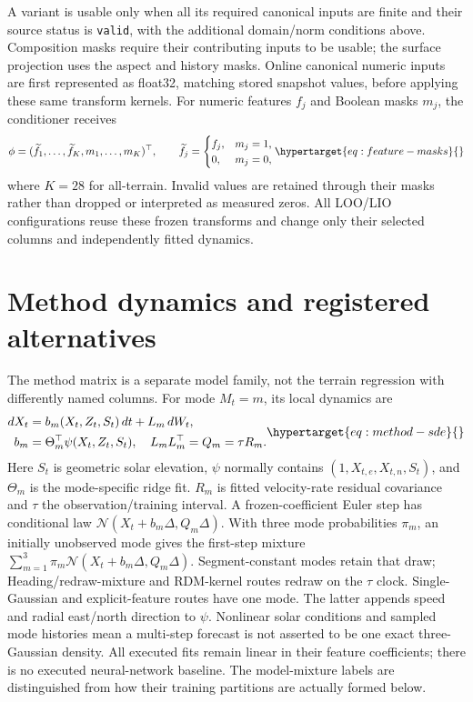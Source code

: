 A variant is usable only when all its required canonical inputs are finite
and their source status is \texttt{valid}, with the additional domain/norm
conditions above. Composition masks require their contributing inputs to be
usable; the surface projection uses the aspect and history masks. Online
canonical numeric inputs are first represented as float32, matching stored
snapshot values, before applying these same transform kernels. For numeric
features \(f_j\) and Boolean masks \(m_j\), the conditioner receives
\begin{equation}
 \phi=(\widetilde f_1,\ldots,\widetilde f_K,m_1,\ldots,m_K)^\top,
 \qquad \widetilde f_j=
 \begin{cases}f_j,&m_j=1,\\0,&m_j=0,\end{cases}
 \label{eq:feature-masks}\hypertarget{eq:feature-masks}{}
\end{equation}
where \(K=28\) for all-terrain. Invalid values are retained through their
masks rather than dropped or interpreted as measured zeros. All LOO/LIO
configurations reuse these frozen transforms and change only their selected
columns and independently fitted dynamics.


\section{Method dynamics and registered alternatives}
\label{sec:method-model}\hypertarget{sec:method-model}{}
The method matrix is a separate model family, not the terrain regression
with differently named columns. For mode \(M_t=m\), its local dynamics are
\begin{equation}
 \begin{aligned}
 dX_t&=b_m(X_t,Z_t,S_t)\,dt+L_m\,dW_t,\\
 b_m&=\Theta_m^\top\psi(X_t,Z_t,S_t),\quad L_mL_m^\top=Q_m=\tau R_m.
 \end{aligned}
 \label{eq:method-sde}\hypertarget{eq:method-sde}{}
\end{equation}
Here \(S_t\) is geometric solar elevation, \(\psi\) normally contains
\((1,X_{t,e},X_{t,n},S_t)\), and \(\Theta_m\) is the mode-specific ridge fit.
\(R_m\) is fitted velocity-rate residual covariance and \(\tau\) the
observation/training interval. A frozen-coefficient Euler step has conditional
law \(\mathcal N(X_t+b_m\Delta,Q_m\Delta)\).
With three mode probabilities \(\pi_m\), an initially unobserved mode gives
the first-step mixture \(\sum_{m=1}^3\pi_m\mathcal N(X_t+b_m\Delta,Q_m\Delta)\).
Segment-constant modes retain that draw; Heading/redraw-mixture and RDM-kernel
routes redraw on the \(\tau\) clock. Single-Gaussian and explicit-feature
routes have one mode. The latter appends speed and radial east/north direction
to \(\psi\). Nonlinear solar conditions and sampled mode histories mean a
multi-step forecast is not asserted to be one exact three-Gaussian density.
All executed fits remain linear in their feature coefficients; there is no
executed neural-network baseline. The model-mixture labels are distinguished
from how their training partitions are actually formed below.

